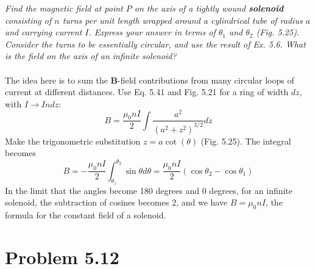 \documentclass[10pt]{article}
\begin{document}
\textit{Find the magnetic field at point $P$ on the axis of a tightly wound \textbf{solenoid} consisting of $n$ turns per unit length wrapped around a cylindrical tube of radius $a$ and carrying current $I$.  Express your answer in terms of $\theta_1$ and $\theta_2$ (Fig. 5.25).  Consider the turns to be essentially circular, and use the result of Ex. 5.6.  What is the field on the axis of an infinite solenoid?} \\ \\
The idea here is to sum the $\mathbf{B}$-field contributions from many circular loops of current at different distances.  Use Eq. 5.41 and Fig. 5.21 for a ring of width $dz$, with $I \rightarrow I n dz$:
\begin{equation}
B = \frac{\mu_0 n I}{2}\int \frac{a^2}{(a^2 + z^2)^{3/2}}dz
\end{equation}
Make the trigonometric substitution $z = a \cot(\theta)$ (Fig. 5.25).  The integral becomes
\begin{equation}
B = -\frac{\mu_0 n I}{2}\int_{\theta_1}^{\theta_2} \sin\theta d\theta = \frac{\mu_0 n I}{2}(\cos\theta_2 - \cos\theta_1)
\end{equation}
In the limit that the angles become 180 degrees and 0 degrees, for an infinite solenoid, the subtraction of cosines becomes 2, and we have $B = \mu_0 n I$, the formula for the constant field of a solenoid.

\section{Problem 5.12}
\end{document}
